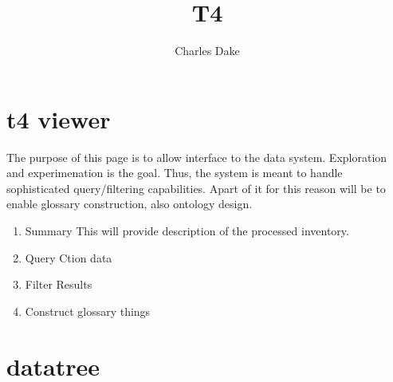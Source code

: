 \documentclass{article}
\title{T4}
\author{Charles Dake}
\begin{document}
\section{t4 viewer}
The purpose of this page is to allow interface to the data system. Exploration and experimenation is the goal. Thus, the system is meant to handle sophisticated query/filtering capabilities. Apart of it for this reason will be to enable glossary construction, also ontology design.

\begin{enumerate}
\item Summary
This will provide description of the processed inventory.

\item Query Ction data

\item Filter Results

\item Construct glossary things

\end{enumerate}


\section{datatree}
\end{document}
